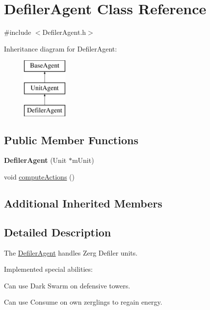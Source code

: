 \hypertarget{class_defiler_agent}{\section{Defiler\-Agent Class Reference}
\label{class_defiler_agent}
}


{\ttfamily \#include $<$Defiler\-Agent.\-h$>$}

Inheritance diagram for Defiler\-Agent\-:\begin{figure}[H]
\begin{center}
\leavevmode
\includegraphics[height=3.000000cm]{class_defiler_agent}
\end{center}
\end{figure}
\subsection*{Public Member Functions}
\begin{DoxyCompactItemize}
\item 
\hypertarget{class_defiler_agent_acc8c7ff3af91fe6187e6d5d59d2da2af}{{\bfseries Defiler\-Agent} (Unit $\ast$m\-Unit)}\label{class_defiler_agent_acc8c7ff3af91fe6187e6d5d59d2da2af}

\item 
void \hyperlink{class_defiler_agent_a925760676459ac4b9fc2becaeb291f6f}{compute\-Actions} ()
\end{DoxyCompactItemize}
\subsection*{Additional Inherited Members}


\subsection{Detailed Description}
The \hyperlink{class_defiler_agent}{Defiler\-Agent} handles Zerg Defiler units.

Implemented special abilities\-:
\begin{DoxyItemize}
\item Can use Dark Swarm on defensive towers.
\item Can use Consume on own zerglings to regain energy.
\end{DoxyItemize}

